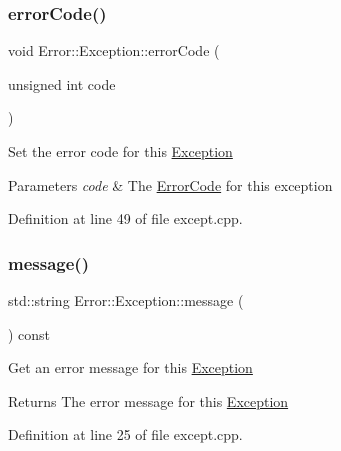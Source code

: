 \subsubsection{\texorpdfstring{error\+Code()}{errorCode()}\hspace{0.1cm}{\footnotesize\ttfamily [2/2]}}
{\footnotesize\ttfamily void Error\+::\+Exception\+::error\+Code (\begin{DoxyParamCaption}\item[{unsigned int}]{code }\end{DoxyParamCaption})\hspace{0.3cm}{\ttfamily [virtual]}}

Set the error code for this \hyperlink{class_error_1_1_exception}{Exception} 
\begin{DoxyParams}{Parameters}
{\em code} & The \hyperlink{namespace_error_1_1_error_code}{Error\+Code} for this exception \\
\hline
\end{DoxyParams}


Definition at line 49 of file except.\+cpp.

\hypertarget{class_error_1_1_exception_a74aebac49ea7118fdf16cf4a47d8723c}{}\label{class_error_1_1_exception_a74aebac49ea7118fdf16cf4a47d8723c} 
\subsubsection{\texorpdfstring{message()}{message()}\hspace{0.1cm}{\footnotesize\ttfamily [1/2]}}
{\footnotesize\ttfamily std\+::string Error\+::\+Exception\+::message (\begin{DoxyParamCaption}{ }\end{DoxyParamCaption}) const\hspace{0.3cm}{\ttfamily [virtual]}}

Get an error message for this \hyperlink{class_error_1_1_exception}{Exception} \begin{DoxyReturn}{Returns}
The error message for this \hyperlink{class_error_1_1_exception}{Exception} 
\end{DoxyReturn}


Definition at line 25 of file except.\+cpp.

\hypertarget{class_error_1_1_exception_adebb86877e373ff1738d3959006ac166}{}\label{class_error_1_1_exception_adebb86877e373ff1738d3959006ac166} 
